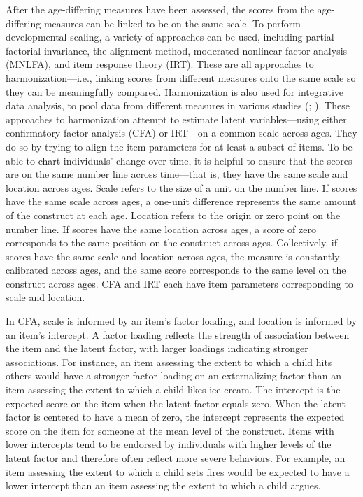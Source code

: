 \documentclass[
  american,
  letterpaper,
  12pt]{article}
\begin{document}
After the age-differing measures have been assessed, the scores from the
age-differing measures can be linked to be on the same scale. To perform
developmental scaling, a variety of approaches can be used, including
partial factorial invariance, the alignment method, moderated nonlinear
factor analysis (MNLFA), and item response theory (IRT). These are all
approaches to harmonization---i.e., linking scores from different
measures onto the same scale so they can be meaningfully compared.
Harmonization is also used for integrative data analysis, to pool data
from different measures in various studies
(;
). These approaches to
harmonization attempt to estimate latent variables---using either
confirmatory factor analysis (CFA) or IRT---on a common scale across
ages. They do so by trying to align the item parameters for at least a
subset of items. To be able to chart individuals' change over time, it
is helpful to ensure that the scores are on the same number line across
time---that is, they have the same scale and location across ages. Scale
refers to the size of a unit on the number line. If scores have the same
scale across ages, a one-unit difference represents the same amount of
the construct at each age. Location refers to the origin or zero point
on the number line. If scores have the same location across ages, a
score of zero corresponds to the same position on the construct across
ages. Collectively, if scores have the same scale and location across
ages, the measure is constantly calibrated across ages, and the same
score corresponds to the same level on the construct across ages. CFA
and IRT each have item parameters corresponding to scale and location.

In CFA, scale is informed by an item's factor loading, and location is
informed by an item's intercept. A factor loading reflects the strength
of association between the item and the latent factor, with larger
loadings indicating stronger associations. For instance, an item
assessing the extent to which a child hits others would have a stronger
factor loading on an externalizing factor than an item assessing the
extent to which a child likes ice cream. The intercept is the expected
score on the item when the latent factor equals zero. When the latent
factor is centered to have a mean of zero, the intercept represents the
expected score on the item for someone at the mean level of the
construct. Items with lower intercepts tend to be endorsed by
individuals with higher levels of the latent factor and therefore often
reflect more severe behaviors. For example, an item assessing the extent
to which a child sets fires would be expected to have a lower intercept
than an item assessing the extent to which a child argues.
\end{document}
